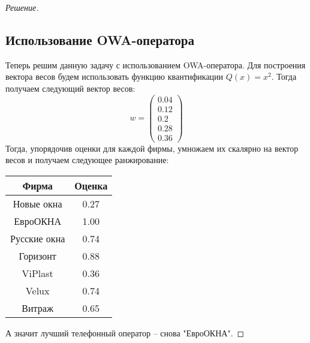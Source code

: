 \documentclass[11pt,a4paper,oneside]{article}
\newenvironment{solution}{
	\begin{proof}[Решение]
		\vspace{-8px}
		\setlength{\parskip}{4px}
		\setlength{\parindent}{0px}
	}{
	\end{proof}
}
\begin{document}
\begin{solution}
	\subsection*{Использование OWA-оператора}
	Теперь решим данную задачу с использованием OWA-оператора. Для построения вектора весов будем использовать функцию квантификации $ Q(x) = x^2 $. Тогда получаем следующий вектор весов:
	\[
	w = 
	\begin{pmatrix} 0.04 \\ 0.12 \\ 0.2 \\ 0.28 \\ 0.36 \end{pmatrix}
	\]
	Тогда, упорядочив оценки для каждой фирмы, умножаем их скалярно на вектор весов и получаем следующее ранжирование:
	\begin{table}[!hbtp]
		\centering
		\begin{tabular}{|c|c|}
			\hline
			Фирма & Оценка   \\ \hline
			Новые окна     & 0.27    \\ \hline
			ЕвроОКНА     &1.00  \\ \hline
			Русские окна 	  &0.74  \\ \hline
			Горизонт     & 0.88  \\ \hline
			ViPlast     & 0.36  \\ \hline
			Velux     & 0.74  \\ \hline
			Витраж     & 0.65  \\ \hline
		\end{tabular}
	\end{table}
	А значит лучший телефонный оператор -- снова "ЕвроОКНА".
	\end{solution}
	\newpage
\end{document}
